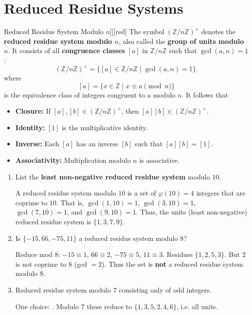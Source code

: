 \documentclass[11pt]{article}
\begin{document}
\newpage




\section*{Reduced Residue Systems}
\begin{define}{Reduced Residue System Modulo $n$}[][red]
  The symbol $(\mathbb{Z}/n\mathbb{Z})^\times$ denotes the 
  \textbf{reduced residue system modulo $n$}, also called the 
  \textbf{group of units modulo $n$}. It consists of all 
  \textbf{congruence classes} $[a]$ in $\mathbb{Z}/n\mathbb{Z}$ 
  such that $\gcd(a, n) = 1$:
  \[
    (\mathbb{Z}/n\mathbb{Z})^\times = \{ [a] \in \mathbb{Z}/n\mathbb{Z} \mid \gcd(a, n) = 1 \}.
  \]
  where 
  $$[a]=\{ x \in \mathbb{Z} \mid x\equiv a \pmod{n} \}$$ 
  is the equivalence class of integers congruent to $a$ modulo $n$. It follows that
  \begin{itemize}
    \item \textbf{Closure:} If $[a], [b] \in (\mathbb{Z}/n\mathbb{Z})^\times$, then $[a][b] \in (\mathbb{Z}/n\mathbb{Z})^\times$.
    \item \textbf{Identity:} $[1]$ is the multiplicative identity.
    \item \textbf{Inverse:} Each $[a]$ has an inverse $[b]$ such that $[a][b] = [1]$.
    \item \textbf{Associativity:} Multiplication modulo $n$ is associative.
  \end{itemize}
\end{define}
\begin{enumerate}
  \item List the \textbf{least non-negative reduced residue system} modulo $10$.
  \begin{subanswer}
    A reduced residue system modulo $10$ is a set of $\varphi(10)=4$ integers that are coprime to $10$. That is,
    $\gcd(1, 10) = 1$, $\gcd(3, 10) = 1$, $\gcd(7, 10) = 1$, and $\gcd(9, 10) = 1$. 
    Thus, the units (least non-negative) reduced residue system is $\boxed{\{1, 3, 7, 9\}}$.
  \end{subanswer}

  \item Is $\{-15,66,-75,11\}$ a reduced residue system modulo $8$?
  \begin{subanswer}
    Reduce mod $8$: $-15\equiv1$, $66\equiv2$, $-75\equiv5$, $11\equiv3$. Residues $\{1,2,5,3\}$. But $2$ is not coprime to $8$ (gcd $=2$). Thus the set is \textbf{not} a reduced residue system modulo $8$.
  \end{subanswer}

  \item Reduced residue system modulo $7$ consisting only of odd integers.
  \begin{subanswer}
    One choice: . Modulo $7$ these reduce to $\{1,3,5,2,4,6\}$, i.e. all units.
  \end{subanswer}
\end{enumerate}
\end{document}
